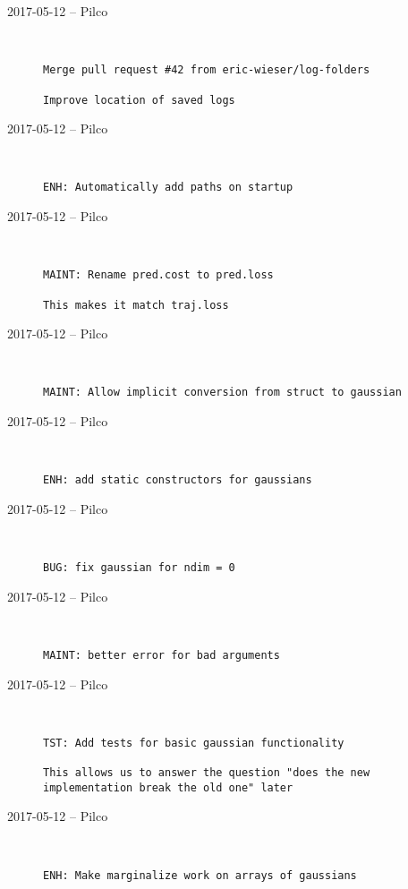 \begin{description}
  \item[2017-05-12 -- Pilco] \hfill \
\begin{lstlisting}
Merge pull request #42 from eric-wieser/log-folders

Improve location of saved logs\end{lstlisting}


  \item[2017-05-12 -- Pilco] \hfill \
\begin{lstlisting}
ENH: Automatically add paths on startup
\end{lstlisting}


  \item[2017-05-12 -- Pilco] \hfill \
\begin{lstlisting}
MAINT: Rename pred.cost to pred.loss

This makes it match traj.loss
\end{lstlisting}


  \item[2017-05-12 -- Pilco] \hfill \
\begin{lstlisting}
MAINT: Allow implicit conversion from struct to gaussian
\end{lstlisting}


  \item[2017-05-12 -- Pilco] \hfill \
\begin{lstlisting}
ENH: add static constructors for gaussians
\end{lstlisting}


  \item[2017-05-12 -- Pilco] \hfill \
\begin{lstlisting}
BUG: fix gaussian for ndim = 0
\end{lstlisting}


  \item[2017-05-12 -- Pilco] \hfill \
\begin{lstlisting}
MAINT: better error for bad arguments
\end{lstlisting}


  \item[2017-05-12 -- Pilco] \hfill \
\begin{lstlisting}
TST: Add tests for basic gaussian functionality

This allows us to answer the question "does the new implementation break the old one" later
\end{lstlisting}


  \item[2017-05-12 -- Pilco] \hfill \
\begin{lstlisting}
ENH: Make marginalize work on arrays of gaussians
\end{lstlisting}



\end{description}
